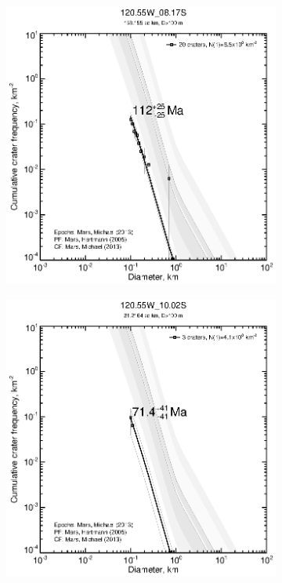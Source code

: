 \documentclass[12pt,letter]{article}
\begin{document}
\begin{figure}[h]
\begin{subfigure}{.33\textwidth}
\end{subfigure}
\begin{subfigure}{.33\textwidth}
  \includegraphics[width=\linewidth,clip,trim=1cm 1cm 1.5cm 1cm]{figures/craterstats/120-55W_08-17S_100m_cum.eps}
\end{subfigure}
\begin{subfigure}{.33\textwidth}
  \includegraphics[width=\linewidth,clip,trim=1cm 1cm 1.5cm 1cm]{figures/craterstats/120-55W_10-02S_100m_cum.eps}

\end{subfigure}
\end{figure}
\end{document}
